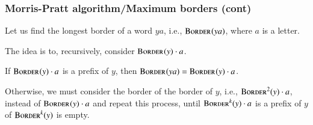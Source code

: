 %
\begin{frame}
\frametitle{Morris-Pratt algorithm/Maximum borders (cont)}

Let us find the longest border of a word \(ya\),
i.e., \(\textsc{Border}^{}(ya)\), where \(a\) is a letter.

\bigskip

The idea is to, recursively, consider \(\textsc{Border}^{}(y) \cdot a\).

\bigskip

If \(\textsc{Border}^{}(y) \cdot a\) is a prefix of \(y\), then
\(\textsc{Border}^{}(ya) = \textsc{Border}^{}(y) \cdot a\).

\bigskip

Otherwise, we must consider the border of the border of \(y\),
i.e., \(\textsc{Border}^{2}(y) \cdot a\), instead of \(\textsc{Border}^{}(y) \cdot a\)
and repeat this process, until \(\textsc{Border}^{k}(y) \cdot a\) is a prefix
of \(y\) of \(\textsc{Border}^{k}(y)\) is empty.

\end{frame}








